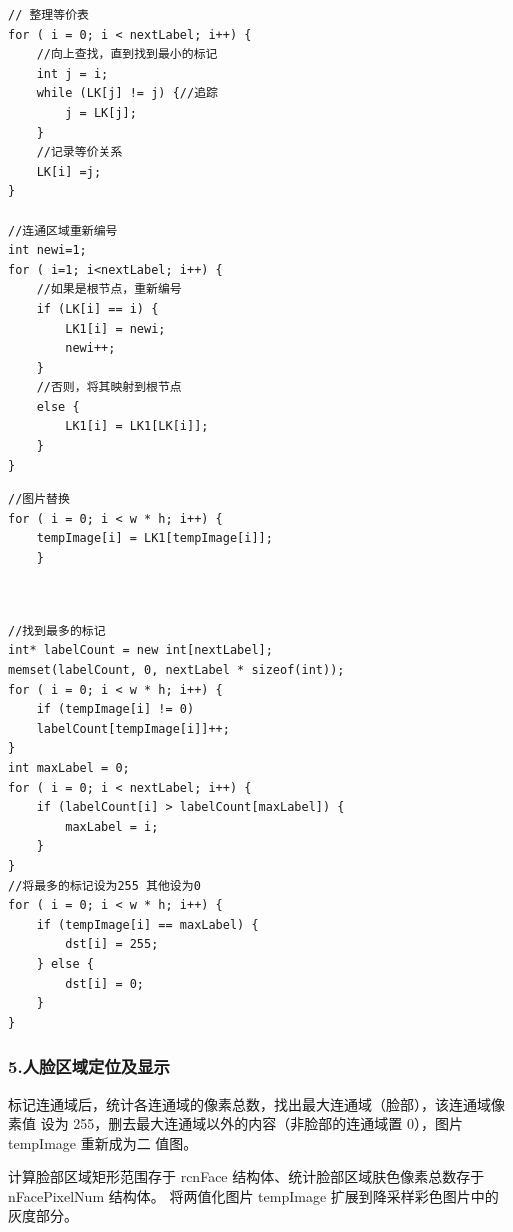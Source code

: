 \documentclass[12pt,hyperref,a4paper,UTF8]{ctexart}
\begin{document}
        \begin{lstlisting}[caption={整理等价表}, label={lst:example}]
// 整理等价表
for ( i = 0; i < nextLabel; i++) {
    //向上查找，直到找到最小的标记
    int j = i;
    while (LK[j] != j) {//追踪
        j = LK[j];
    }
    //记录等价关系
    LK[i] =j;
}

//连通区域重新编号
int newi=1;
for ( i=1; i<nextLabel; i++) {
    //如果是根节点，重新编号
    if (LK[i] == i) {
        LK1[i] = newi;
        newi++;
    }
    //否则，将其映射到根节点
    else {
        LK1[i] = LK1[LK[i]];
    }
}
        \end{lstlisting}


        \begin{lstlisting}[caption={图片替换}, label={lst:example}]
//图片替换
for ( i = 0; i < w * h; i++) {
    tempImage[i] = LK1[tempImage[i]];
    }

            
        \end{lstlisting}



        \begin{lstlisting}[caption={开运算和闭运算函数}, label={lst:example}]
//找到最多的标记
int* labelCount = new int[nextLabel];
memset(labelCount, 0, nextLabel * sizeof(int));
for ( i = 0; i < w * h; i++) {
    if (tempImage[i] != 0)
    labelCount[tempImage[i]]++;
}
int maxLabel = 0;
for ( i = 0; i < nextLabel; i++) {
    if (labelCount[i] > labelCount[maxLabel]) {
        maxLabel = i;
    }
}
//将最多的标记设为255 其他设为0
for ( i = 0; i < w * h; i++) {
    if (tempImage[i] == maxLabel) {
        dst[i] = 255;
    } else {
        dst[i] = 0;
    }
}
        \end{lstlisting}

















        \subsubsection*{\large \textbf{5.人脸区域定位及显示}}
标记连通域后，统计各连通域的像素总数，找出最大连通域（脸部），该连通域像素值
设为 255，删去最大连通域以外的内容（非脸部的连通域置 0），图片 tempImage 重新成为二
值图。

计算脸部区域矩形范围存于 rcnFace 结构体、统计脸部区域肤色像素总数存于nFacePixelNum 结构体。
将两值化图片 tempImage 扩展到降采样彩色图片中的灰度部分。
        
\end{document}
